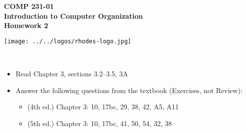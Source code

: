 \documentclass[10pt]{article}
\begin{document}

\hspace{-5mm}
\begin{minipage}{0.65\linewidth}
  \textbf{
      \hspace{-3mm}
      {\Large COMP 231-01}\\
      {\Large Introduction to Computer Organization}\\
      {\Large Homework 2}}
\end{minipage}
\begin{minipage}{0.35\linewidth}
  \texttt{[image: ../../logos/rhodes-logo.jpg]}
\end{minipage}

\\


\begin{itemize}

\setlength\itemsep{10mm}

\item Read Chapter 3, sections 3.2--3.5, 3A

\item Answer the following questions from the textbook (Exercises, not
  Review):



  \begin{itemize}
\setlength\itemsep{5mm}
\item (4th ed.) Chapter 3: 10, 17bc, 29, 38, 42, A5, A11
\item (5th ed.) Chapter 3: 10, 17bc, 41, 50, 54, 32, 38

\end{itemize}

\end{itemize}
\end{document}
